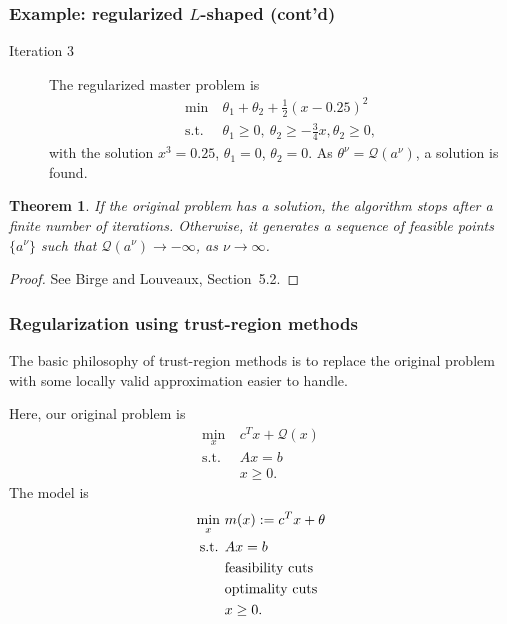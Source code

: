 \documentclass{beamer}
\newtheorem{theo}{Theorem}
\def\cQ{\mathcal{Q}}
\begin{document}
\begin{frame}
\frametitle{Example: regularized $L$-shaped (cont'd)}

\begin{description}
\item[Iteration 3]
The regularized master problem is
\begin{align*}
\min\ & \theta_1 + \theta_2 + \frac{1}{2}(x-0.25)^2 \\
\mbox{s.t. } & \theta_1 \geq 0,\ \theta_2 \geq -\frac{3}{4}x, \theta_2
\geq 0,
\end{align*}
with the solution $x^3 = 0.25$, $\theta_1 = 0$, $\theta_2 = 0$.
As $\theta^{\nu} = \mathcal{Q}(a^{\nu})$, a solution is found.
\end{description}

\begin{theo}
If the original problem has a solution, the algorithm stops after a finite number of iterations.
Otherwise, it generates a sequence of feasible points $\lbrace a^{\nu} \rbrace$ such that
$\mathcal{Q}(a^{\nu}) \rightarrow -\infty$, as $\nu \rightarrow \infty$.
\end{theo}
\begin{proof}
See Birge and Louveaux, Section~5.2.
\end{proof}
\end{frame}

\begin{frame}
\frametitle{Regularization using trust-region methods}

The basic philosophy of trust-region methods is to replace the original problem with some locally valid approximation easier to handle.

\mbox{}

Here, our original problem is
\begin{align*}
\min_x \ & c^T x + \cQ(x) \\
\mbox{s.t. } & Ax = b \\
& x \geq 0.
\end{align*}
The model is
\begin{align*}
\min_x \ & m(x) := c^T x + \theta \\
\mbox{s.t. } & Ax = b \\
& {\rm feasibility\ cuts} \\
& {\rm optimality\ cuts} \\
& x \geq 0.
\end{align*}
\end{frame}
\end{document}
